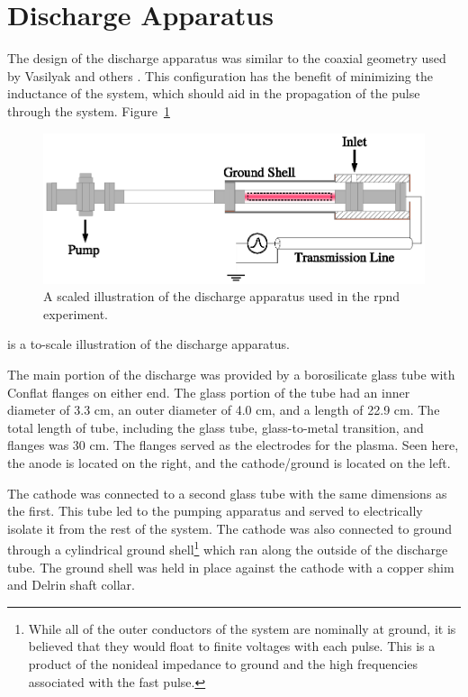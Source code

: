 \section{Discharge Apparatus}

The design of the discharge apparatus was similar to the coaxial geometry used
by Vasilyak and others \cite{Vasilyak1994}. This configuration has the benefit
of minimizing the inductance of the system, which should aid in the propagation
of the pulse through the system. Figure~\ref{fig:appschem}
\begin{figure}
  \centering
  \includegraphics{./chapters/experiment/figures/appschem.eps}
  \caption{A scaled illustration of the discharge apparatus used in the
  \acs{rpnd} experiment.}
  \label{fig:appschem}
\end{figure}
is a to-scale illustration of the discharge apparatus.

The main portion of the discharge was provided by a borosilicate glass tube with
Conflat flanges on either end. The glass portion of the tube had an inner
diameter of 3.3 cm, an outer diameter of 4.0 cm, and a length of 22.9 cm. The
total length of tube, including the glass tube, glass-to-metal transition, and
flanges was 30 cm. The flanges served as the electrodes for the plasma. Seen
here, the anode is located on the right, and the cathode/ground is located on
the left.

The cathode was connected to a second glass tube with the same dimensions as the
first. This tube led to the pumping apparatus and served to electrically isolate
it from the rest of the system. The cathode was also connected to ground through
a cylindrical ground shell\footnote{While all of the outer conductors of the
system are nominally at ground, it is believed that they would float to finite
voltages with each pulse. This is a product of the nonideal impedance to ground
and the high frequencies associated with the fast pulse.} which ran along the
outside of the discharge tube. The ground shell was held in place against the
cathode with a copper shim and Delrin shaft collar.

